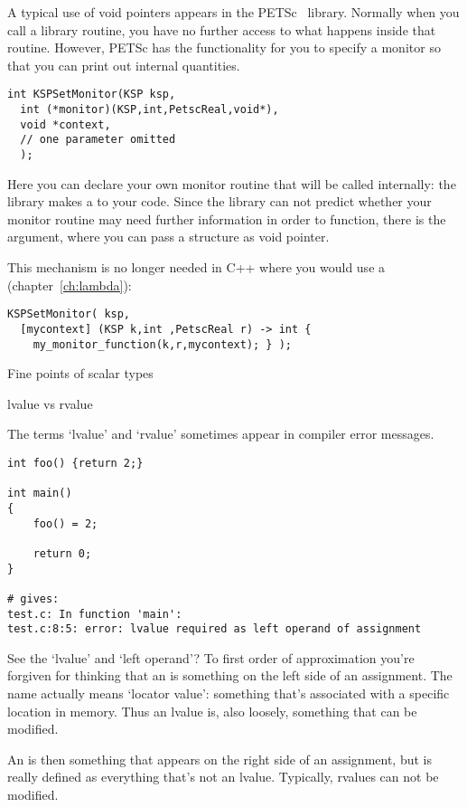 A typical use of void pointers appears in the
PETSc~\cite{petsc-efficient,petsc-home-page} library. Normally when
you call a library routine, you have no further access to what happens
inside that routine. However, PETSc has the functionality for you to
specify a monitor so that you can print out internal quantities.
\begin{lstlisting}
int KSPSetMonitor(KSP ksp,
  int (*monitor)(KSP,int,PetscReal,void*),
  void *context,
  // one parameter omitted
  );
\end{lstlisting}
Here you can declare your own monitor routine that will be called
internally: the library makes a  to your code.
Since the library can not predict whether your monitor routine may
need further information in order to function, there is the
 argument, where you can pass a structure as void pointer.

This mechanism is no longer needed in C++ where you would use a
 (chapter~\ref{ch:lambda}):
\begin{lstlisting}
KSPSetMonitor( ksp,
  [mycontext] (KSP k,int ,PetscReal r) -> int {
    my_monitor_function(k,r,mycontext); } );
\end{lstlisting}

 {Fine points of scalar types}
\label{sec:scalar}


 {lvalue vs rvalue}
\label{sec:lrvalue}

The terms `lvalue' and `rvalue' sometimes appear in compiler error
messages.
\begin{lstlisting}
int foo() {return 2;}

int main()
{
    foo() = 2;

    return 0;
}

# gives:
test.c: In function 'main':
test.c:8:5: error: lvalue required as left operand of assignment
\end{lstlisting}

See the `lvalue' and `left operand'? To first order of approximation
you're forgiven for thinking that an  is something
on the left side of an assignment. The name actually means `locator
value': something that's associated with a specific location in
memory. Thus an lvalue is, also loosely, something that can be modified.

An  is then something that appears on the right
side of an assignment, but is really defined as everything that's not
an lvalue. Typically, rvalues can not be modified.

